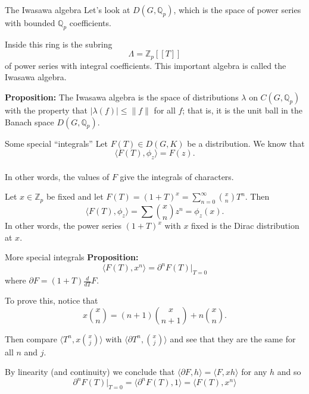 \documentclass[
  ignorenonframetext,
]{beamer}
\begin{document}
\begin{frame}{The Iwasawa algebra}
\protect\hypertarget{the-iwasawa-algebra}{}
Let's look at \(D(G,\mathbb{Q}_p)\), which is the space of power series
with bounded \(\mathbb{Q}_p\) coefficients.

Inside this ring is the subring \[
\Lambda = \mathbb{Z}_p[[T]]
\] of power series with integral coefficients. This important algebra is
called the Iwasawa algebra.

\textbf{Proposition:} The Iwasawa algebra is the space of distributions
\(\lambda\) on \(C(G,\mathbb{Q}_p)\) with the property that
\(|\lambda(f)|\le \|f\|\) for all \(f\); that is, it is the unit ball in
the Banach space \(D(G,\mathbb{Q}_p)\).
\end{frame}

\begin{frame}{Some special ``integrals''}
\protect\hypertarget{some-special-integrals}{}
Let \(F(T)\in D(G,K)\) be a distribution. We know that \[
\langle F(T),\phi_z\rangle = F(z).
\]\\
In other words, the values of \(F\) give the integrals of characters.

Let \(x\in\mathbb{Z}_p\) be fixed and let
\(F(T)=(1+T)^x=\sum_{n=0}^{\infty}\binom{x}{n}T^{n}\). Then \[
\langle F(T),\phi_z\rangle = \sum\binom{x}{n}z^n=\phi_z(x).
\] In other words, the power series \((1+T)^x\) with \(x\) fixed is the
Dirac distribution at \(x\).
\end{frame}

\begin{frame}{More special integrals}
\protect\hypertarget{more-special-integrals}{}
\textbf{Proposition:} \[
\langle F(T), x^n\rangle = \partial^n F(T)|_{T=0}
\] where \(\partial F=(1+T)\frac{d}{dT}F\).

To prove this, notice that \[
x\binom{x}{n} = (n+1)\binom{x}{n+1}+n\binom{x}{n}.
\]

Then compare \(\langle T^n, x\binom{x}{j}\rangle\) with
\(\langle \partial T^{n}, \binom{x}{j}\rangle\) and see that they are
the same for all \(n\) and \(j\).

By linearity (and continuity) we conclude that
\(\langle \partial F,h\rangle = \langle F, xh\rangle\) for any \(h\) and
so \[
\partial^n F(T)|_{T=0}=\langle \partial^n F(T), 1\rangle =\langle F(T),x^n\rangle
\]
\end{frame}
\end{document}
